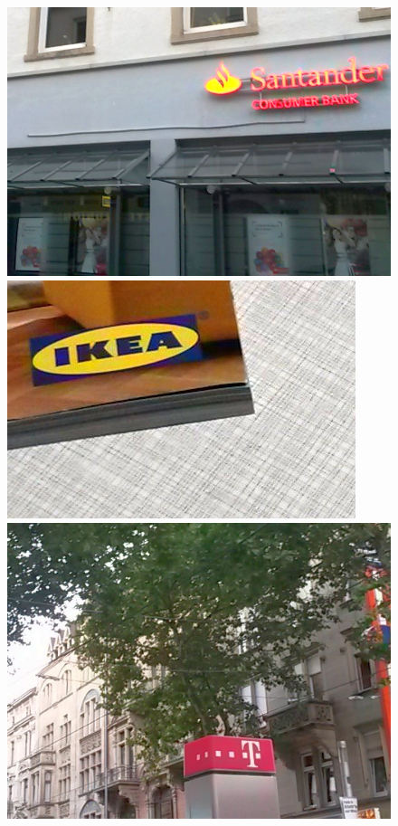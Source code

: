 \documentclass[a4paper,twoside]{article}
\newlength{\frameSize}
\begin{document}
%
\setlength{\frameSize}{3.7cm}
\begin{figure}%
\centering%
\includegraphics[height=\frameSize]{img/sample2.png}
\hfill
\includegraphics[height=\frameSize]{img/sample12.png}
\hfill
\includegraphics[height=\frameSize]{img/sample3.png}%

\end{figure}
\end{document}
